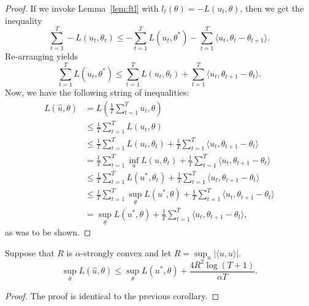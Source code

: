 \documentclass{article}
\begin{document}
\begin{proof}
If we invoke Lemma~\ref{lem:ftl} with $l_t(\theta) = -L(u_t, \theta)$, then we get the inequality
\[ \sum_{t=1}^T -L(u_t, \theta_t) \leq -\sum_{t=1}^T L(u_t, \theta^*) - \sum_{t=1}^T \langle u_t, \theta_t - \theta_{t+1} \rangle. \]
Re-arranging yields
\[ \sum_{t=1}^T L(u_t, \theta^*) \leq \sum_{t=1}^T L(u_t, \theta_t) + \sum_{t=1}^T \langle u_t, \theta_{t+1} - \theta_t \rangle. \]
Now, we have the following string of inequalities:
\begin{align*}
L(\hat{u}, \theta) &= L\left(\frac{1}{T} \sum_{t=1}^T u_t, \theta\right) \\
 &\leq \frac{1}{T} \sum_{t=1}^T L(u_t, \theta) \\
 &\leq \frac{1}{T} \sum_{t=1}^T L(u_t, \theta_t) + \frac{1}{T} \sum_{t=1}^T \langle u_t, \theta_{t+1} - \theta_t \rangle \\
 &= \frac{1}{T} \sum_{t=1}^T \inf_{u} L(u, \theta_t) + \frac{1}{T} \sum_{t=1}^T \langle u_t, \theta_{t+1} - \theta_t \rangle \\
 &\leq \frac{1}{T} \sum_{t=1}^T L(u^*, \theta_t) + \frac{1}{T} \sum_{t=1}^T \langle u_t, \theta_{t+1} - \theta_t \rangle \\
 &\leq \frac{1}{T} \sum_{t=1}^T \sup_{\theta} L(u^*, \theta) + \frac{1}{T} \sum_{t=1}^T \langle u_t, \theta_{t+1} - \theta_t \rangle \\
 &= \sup_{\theta} L(u^*, \theta) + \frac{1}{T} \sum_{t=1}^T \langle u_t, \theta_{t+1} - \theta_t \rangle,
\end{align*}
as was to be shown.
\end{proof}
\begin{corollary}
\label{cor:method-2}
Suppose that $R$ is $\alpha$-strongly convex and let $R = \sup_{u} |\langle u, u \rangle|$. 
\[ \sup_{\theta} L(\hat{u}, \theta) \leq \sup_{\theta} L(u^*, \theta) + \frac{4R^2\log(T+1)}{\alpha T}. \]
\end{corollary}
\begin{proof}
The proof is identical to the previous corollary.
\end{proof}
\end{document}
